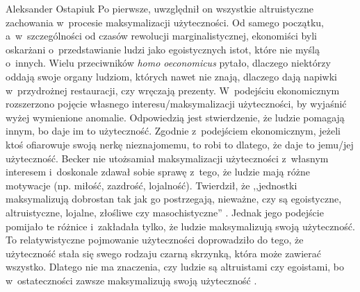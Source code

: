 \begin{artplenv}{Aleksander Ostapiuk}
Po pierwsze, uwzględnił on wszystkie altruistyczne zachowania w~procesie maksymalizacji użyteczności. Od samego początku,
a~w~szczególności od czasów rewolucji marginalistycznej, ekonomiści byli oskarżani o~przedstawianie ludzi jako
egoistycznych istot, które nie myślą o~innych. Wielu przeciwników \textit{homo oeconomicus} pytało, dlaczego niektórzy
oddają swoje organy ludziom, których nawet nie znają, dlaczego dają napiwki w~przydrożnej restauracji, czy wręczają
prezenty. W~podejściu ekonomicznym rozszerzono pojęcie własnego interesu/maksymalizacji użyteczności, by wyjaśnić wyżej
wymienione anomalie. Odpowiedzią jest stwierdzenie, że ludzie pomagają innym, bo daje im to użyteczność.
Zgodnie z~podejściem ekonomicznym, jeżeli ktoś ofiarowuje swoją nerkę nieznajomemu, to robi to dlatego, że daje to jemu/jej
użyteczność. Becker nie utożsamiał maksymalizacji użyteczności z~własnym interesem i~doskonale zdawał sobie
sprawę z~tego, że ludzie mają różne motywacje (np. miłość, zazdrość, lojalność). Twierdził, że ,,jednostki maksymalizują
dobrostan tak jak go postrzegają, nieważne, czy są egoistyczne, altruistyczne, lojalne, złośliwe czy masochistyczne''
\parencite[s.~386]{becker_economic_1993}.
Jednak jego podejście pomijało te różnice i~zakładała
tylko, że ludzie maksymalizują swoją użyteczność. To relatywistyczne pojmowanie użyteczności doprowadziło do tego, że
użyteczność stała się swego rodzaju czarną skrzynką, która może zawierać wszystko. Dlatego nie ma znaczenia, czy ludzie
są altruistami czy egoistami, bo w~ostateczności zawsze maksymalizują swoją użyteczność
\parencite{sen_rational_1977}.


\end{artplenv}
